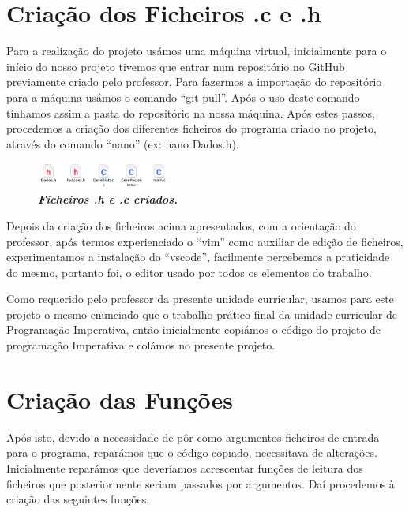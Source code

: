 \documentclass[a4wide]{report}
\begin{document}
\section{Criação dos Ficheiros .c e .h}
\Large
	Para a realização do projeto usámos uma máquina virtual, inicialmente para o início do nosso projeto tivemos que entrar num repositório no GitHub previamente criado pelo professor. Para fazermos a importação do repositório para a máquina usámos o comando “git pull”. Após o uso deste comando tínhamos assim a pasta do repositório na nossa máquina. Após estes passos, procedemos a criação dos diferentes ficheiros do programa criado no projeto, através do comando “nano” (ex: nano Dados.h).
\begin{figure}[hbt]
    \centering
    \includegraphics[width=0.40\textwidth]{criacaoficheiros.png}
    \caption{\textbf{\textit{Ficheiros .h e .c criados.}}\label{fig:imagem}}
\end{figure}
	Depois da criação dos ficheiros acima apresentados, com a orientação do professor, após termos experienciado o “vim” como auxiliar de edição de ficheiros, experimentamos a instalação do “vscode”, facilmente percebemos a praticidade do mesmo, portanto foi, o editor usado por todos os elementos do trabalho. 

	Como requerido pelo professor da presente unidade curricular, usamos para este projeto o mesmo enunciado que o trabalho prático final da unidade curricular de Programação Imperativa, então inicialmente copiámos o código do projeto de programação Imperativa e colámos no presente projeto. 

\section{Criação das Funções}
\Large

	Após isto, devido a necessidade de pôr como argumentos ficheiros de entrada para o programa, reparámos que o código copiado, necessitava de alterações. Inicialmente reparámos que deveríamos acrescentar funções de leitura dos ficheiros que posteriormente seriam passados por argumentos. Daí procedemos à criação das seguintes funções. 
\end{document}
